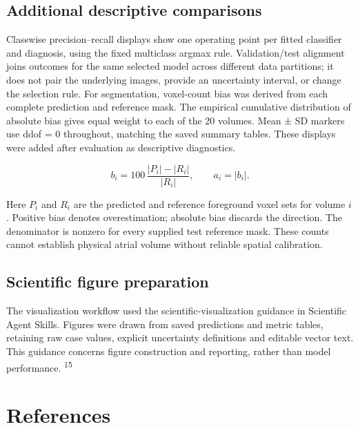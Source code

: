 \documentclass[11pt,a4paper]{article}
\begin{document}
\subsection*{Additional descriptive comparisons}

Classwise precision–recall displays show one operating point per fitted classifier and diagnosis, using the fixed multiclass argmax rule. Validation/test alignment joins outcomes for the same selected model across different data partitions; it does not pair the underlying images, provide an uncertainty interval, or change the selection rule. For segmentation, voxel-count bias was derived from each complete prediction and reference mask. The empirical cumulative distribution of absolute bias gives equal weight to each of the 20 volumes. Mean ± SD markers use ddof = 0 throughout, matching the saved summary tables. These displays were added after evaluation as descriptive diagnostics.




\begin{equation}
\label{eq:voxel-count-bias}
b_i=100\,\frac{|P_i|-|R_i|}{|R_i|},\qquad a_i=|b_i|.
\end{equation}


Here $P_i$ and $R_i$ are the predicted and reference foreground voxel sets for volume $i$. Positive bias denotes overestimation; absolute bias discards the direction. The denominator is nonzero for every supplied test reference mask. These counts cannot establish physical atrial volume without reliable spatial calibration.



\subsection*{Scientific figure preparation}

The visualization workflow used the scientific-visualization guidance in Scientific Agent Skills. Figures were drawn from saved predictions and metric tables, retaining raw case values, explicit uncertainty definitions and editable vector text. This guidance concerns figure construction and reporting, rather than model performance. \textsuperscript{15}



\clearpage

\section*{References}
\end{document}
